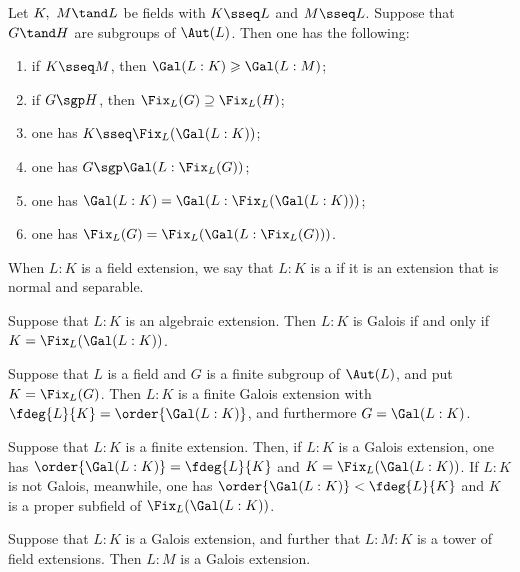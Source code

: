 \documentclass{article}
\begin{document}
  \begin{tproposition}
    Let \( K,\ M \tand L \) be fields with \( K\sseq L \) and \( M\sseq L \).
    Suppose that \( G\tand H \) are subgroups of \( \Aut(L) \).
    Then one has the following: \begin{enumerate}[label=(\alph*)]
      \item if \( K\sseq M \), then \( \Gal(L:K) \geqslant \Gal(L:M) \);
      \item if \( G\sgp H \), then \( \Fix_L(G)\supseteq \Fix_L(H) \);
      \item one has \( K\sseq \Fix_L(\Gal(L:K)) \);
      \item one has \( G\sgp\Gal(L:\Fix_L(G)) \);
      \item one has \( \Gal(L:K) = \Gal(L:\Fix_L(\Gal(L:K))) \);
      \item one has \( \Fix_L(G) = \Fix_L(\Gal(L:\Fix_L(G))) \).
    \end{enumerate}
  \end{tproposition}

  \begin{tdefinition}
    When \( L:K \) is a field extension, we say that \( L:K \) is a  if it is an extension that is normal and separable.
  \end{tdefinition}

  \begin{ttheorem}
    Suppose that \( L:K \) is an algebraic extension.
    Then \( L:K \) is Galois if and only if \( K=\Fix_L(\Gal(L:K)) \).
  \end{ttheorem}

  \begin{ttheorem}
    Suppose that \( L \) is a field and \( G \) is a finite subgroup of \( \Aut(L) \), and put \( K=\Fix_L(G) \).
    Then \( L:K \) is a finite Galois extension with \( \fdeg{L}{K}=\order{\Gal(L:K)} \), and furthermore \( G=\Gal(L:K) \).
  \end{ttheorem}

  \begin{ttheorem}
    Suppose that \( L:K \) is a finite extension.
    Then, if \( L:K \) is a Galois extension, one has \( \order{\Gal(L:K)}=\fdeg{L}{K} \) and \( K=\Fix_L(\Gal(L:K)) \).
    If \( L:K \) is not Galois, meanwhile, one has \( \order{\Gal(L:K)}<\fdeg{L}{K} \) and \( K \) is a proper subfield of \( \Fix_L(\Gal(L:K)) \).
  \end{ttheorem}

  \begin{tproposition}
    Suppose that \( L:K \) is a Galois extension, and further that \( L:M:K \) is a tower of field extensions.
    Then \( L:M \) is a Galois extension.
  \end{tproposition}
\end{document}
